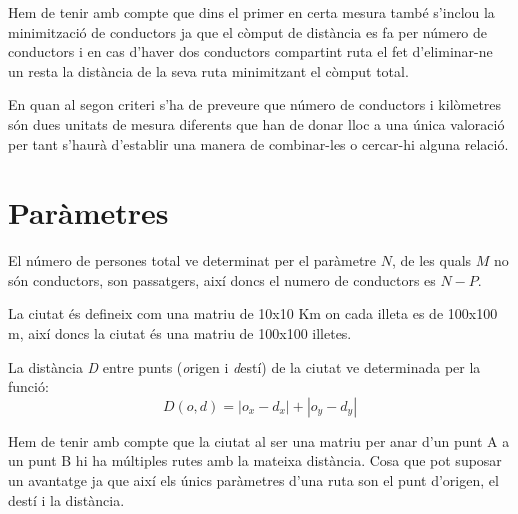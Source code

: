 Hem de tenir amb compte que dins el primer en certa mesura també s'inclou la minimització de conductors
ja que el còmput de distància es fa per número de conductors i en cas d'haver dos conductors compartint
ruta el fet d'eliminar-ne un resta la distància de la seva ruta minimitzant el còmput total.

En quan al segon criteri s'ha de preveure que número de conductors i kilòmetres són dues unitats de 
mesura diferents que han de donar lloc a una única valoració per tant s'haurà d'establir una manera 
de combinar-les o cercar-hi alguna relació.

\section{Paràmetres}

El número de persones total ve determinat per el paràmetre $N$, de les quals $M$ no són conductors,
son passatgers, així doncs el numero de conductors es $N-P$. 

La ciutat és defineix com una matriu de 10x10 Km on cada illeta es de 100x100 m, així doncs
la ciutat és una matriu de 100x100 illetes.

La distància \emph{D} entre punts (\emph{o}rigen i \emph{d}estí) de la ciutat ve determinada per la funció:
$$ D(o,d) = |o_x - d_x| + |o_y - d_y| $$

Hem de tenir amb compte que la ciutat al ser una matriu per anar d'un punt A a un punt B hi ha múltiples
rutes amb la mateixa distància. Cosa que pot suposar un avantatge ja que així els únics paràmetres
d'una ruta son el punt d'origen, el destí i la distància.
